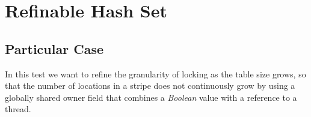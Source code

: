 


\section{\textbf{Refinable Hash Set}}



\subsection{Particular Case}
\par
In this test we want to refine the granularity of locking as the table size grows, so that the number of locations in a stripe does not continuously grow by using a globally shared owner field that combines a \textit{Boolean} value with a reference to a thread.
\par



